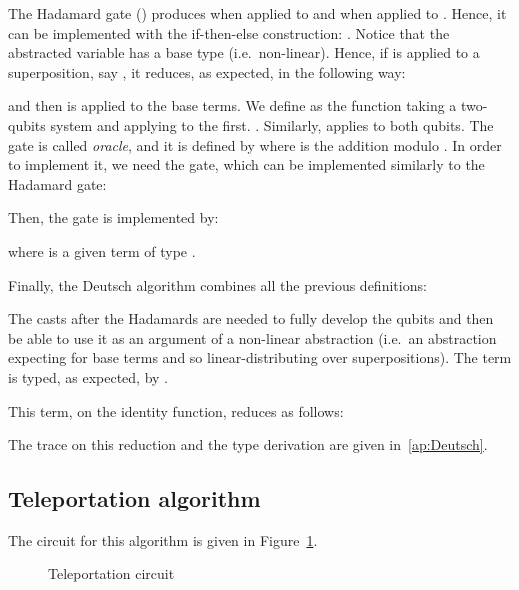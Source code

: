 \documentclass[preprint]{elsarticle}
\begin{document}
The Hadamard gate () produces  when
applied to  and  when applied
to . Hence, it can be implemented with the if-then-else construction:
. Notice that the abstracted variable has a base type
(i.e.~non-linear). Hence, if  is applied to a superposition, say
, it reduces, as expected, in the following
way:

and then is applied to the base terms. We define  as the function taking
a two-qubits system and applying  to the first. . Similarly,  applies  to both qubits.
 The gate
 is called {\em oracle}, and it is defined by  where  is the addition modulo . In order to implement it, we
need the  gate, which can be implemented similarly to the Hadamard
gate:

Then, the  gate is implemented by:

where  is a given term of type .

Finally, the Deutsch algorithm combines all the previous definitions:


The casts after the Hadamards are needed to fully develop the qubits and then be
able to use it as an argument of a non-linear abstraction (i.e.~an abstraction
expecting for base terms and so linear-distributing over superpositions). The
 term is typed, as expected, by .

This term, on the identity function, reduces as follows:


The trace on this reduction and the type derivation are given in~\ref{ap:Deutsch}.

\subsection{Teleportation algorithm}\label{ex:telep}

The circuit for this algorithm is given in Figure~\ref{fig:telep}.
\begin{figure}[t]
  \begin{center}
  \end{center}
  \caption{Teleportation circuit}
  \label{fig:telep}
\end{figure}
\end{document}
